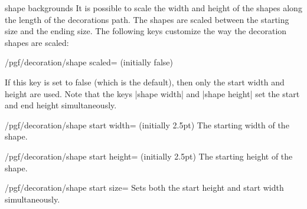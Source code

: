 \begin{decoration}{shape backgrounds}
    It is possible to scale the width and height of the shapes along the length
    of the decorations path. The shapes are scaled between the starting size
    and the ending size. The following keys customize the way the decoration
    shapes are scaled:

    \begin{key}{/pgf/decoration/shape scaled= (initially false)}
\begin{codeexample}[]
\end{codeexample}

        If this key is set to false (which is the default), then only the start
        width and height are used. Note that the keys |shape width| and
        |shape height| set the start and end height simultaneously.
    \end{key}

    \begin{key}{/pgf/decoration/shape start width= (initially 2.5pt)}
        The starting width of the shape.
    \end{key}%

    \begin{key}{/pgf/decoration/shape start height= (initially 2.5pt)}
        The starting height of the shape.
    \end{key}%

    \begin{stylekey}{/pgf/decoration/shape start size=}
        Sets both the start height and start width simultaneously.
    \end{stylekey}%


\end{decoration}
